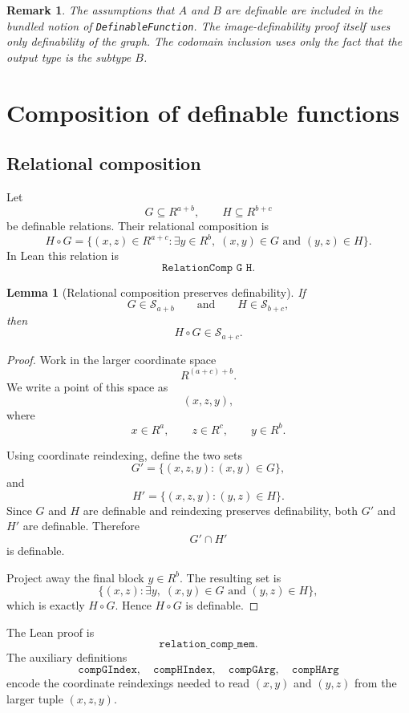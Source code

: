 \documentclass[11pt]{article}
\newtheorem{lemma}[definition]{Lemma}
\newtheorem{remark}[definition]{Remark}
\newcommand{\Sfam}{\mathcal S}
\newcommand{\Lean}[1]{\texttt{#1}}
\begin{document}
\begin{remark}
The assumptions that $A$ and $B$ are definable are included in the bundled notion of
\Lean{DefinableFunction}.  The image-definability proof itself uses only definability of the graph.
The codomain inclusion uses only the fact that the output type is the subtype $B$.
\end{remark}

\section{Composition of definable functions}

\subsection{Relational composition}

Let
\[
  G\subseteq R^{a+b},
  \qquad
  H\subseteq R^{b+c}
\]
be definable relations.  Their relational composition is
\[
  H\circ G
  =
  \{(x,z)\in R^{a+c}:\exists y\in R^b,
  \;(x,y)\in G\text{ and }(y,z)\in H\}.
\]
In Lean this relation is
\[
  \Lean{RelationComp G H}.
\]

\begin{lemma}[Relational composition preserves definability]
If
\[
  G\in\Sfam_{a+b}
  \qquad\text{and}\qquad
  H\in\Sfam_{b+c},
\]
then
\[
  H\circ G\in\Sfam_{a+c}.
\]
\end{lemma}

\begin{proof}
Work in the larger coordinate space
\[
  R^{(a+c)+b}.
\]
We write a point of this space as
\[
  (x,z,y),
\]
where
\[
  x\in R^a,
  \qquad
  z\in R^c,
  \qquad
  y\in R^b.
\]

Using coordinate reindexing, define the two sets
\[
  G'=\bigl\{(x,z,y):(x,y)
  \in G\bigr\},
\]
and
\[
  H'=\bigl\{(x,z,y):(y,z)
  \in H\bigr\}.
\]
Since $G$ and $H$ are definable and reindexing preserves definability, both $G'$ and $H'$ are
definable.  Therefore
\[
  G'\cap H'
\]
is definable.

Project away the final block $y\in R^b$.  The resulting set is
\[
  \{(x,z):\exists y,
  \;(x,y)\in G
  \text{ and }
  (y,z)
  \in H\},
\]
which is exactly $H\circ G$.  Hence $H\circ G$ is definable.
\end{proof}

The Lean proof is
\[
  \Lean{relation\_comp\_mem}.
\]
The auxiliary definitions
\[
  \Lean{compGIndex},\quad
  \Lean{compHIndex},\quad
  \Lean{compGArg},\quad
  \Lean{compHArg}
\]
encode the coordinate reindexings needed to read $(x,y)$ and $(y,z)$ from the larger tuple
$(x,z,y)$.
\end{document}
